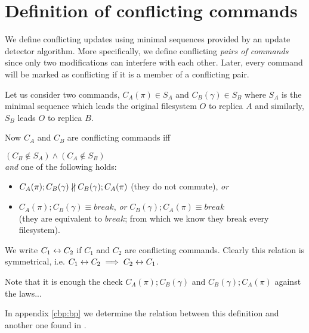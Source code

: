 \section{Definition of conflicting commands}
\label{cbp:defconfl}

We define conflicting updates using minimal sequences provided by an
update detector algorithm. More specifically, we define conflicting \emph{pairs
of commands} since only two modifications can interfere with each other.
Later, every command will be marked as conflicting if it is a member of a
conflicting pair.

Let us consider two commands, \(C_A(\pi)\in S_A\) and \(C_B(\gamma)\in S_B\) 
where \(S_A\) is the minimal sequence which
leads the original filesystem \(O\) to replica \(A\) and similarly,
\(S_B\) leads \(O\) to replica \(B\).

Now \(C_A\) and \(C_B\) are conflicting commands iff
\begin{center}
\((C_B\not\in S_A)\wedge(C_A\not\in S_B)\)\\\medskip
\emph{and} one of the following holds:\\\medskip
\begin{minipage}{12cm}
\begin{itemize}
\item \(C_A(\pi); C_B(\gamma) \nparallel C_B(\gamma); C_A(\pi)\)
 (they do not commute), \emph{or}
\item \(C_A(\pi); C_B(\gamma) \equiv break\), \emph{or}
\(C_B(\gamma); C_A(\pi) \equiv break\)\\(they are equivalent to \(break\);
from which we know they break every filesystem).
\end{itemize}\end{minipage}
\end{center}

We write \(C_1\leftrightarrow C_2\) if \(C_1\) and \(C_2\) are conflicting
commands.
Clearly this relation is symmetrical, i.e.
\(C_1\leftrightarrow C_2\implies C_2\leftrightarrow C_1\).

Note that it is enough the check \(C_A(\pi); C_B(\gamma)\) and
\(C_B(\gamma); C_A(\pi)\) against the laws...

In appendix \ref{cbp:bp} we determine the relation between this
definition and another one found in \BP.

